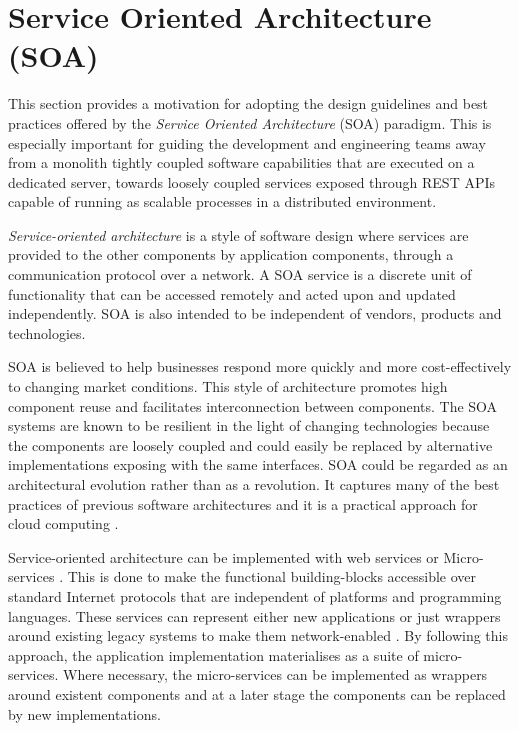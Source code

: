 	 \section{Service Oriented Architecture (SOA)}
	 \label{sec:soa}
	 
	 This section provides a motivation for adopting the design guidelines and best practices offered by the \textit{Service Oriented Architecture } (SOA) \cite{open2016soa} paradigm. This is especially important for guiding the development and engineering teams away from a monolith tightly coupled software capabilities that are executed on a dedicated server, towards loosely coupled services exposed through REST APIs capable of running as scalable processes in a distributed environment.
	  
	 \textit{Service-oriented architecture} is a style of software design where services are provided to the other components by application components, through a communication protocol over a network. A SOA service is a discrete unit of functionality that can be accessed remotely and acted upon and updated independently. SOA is also intended to be independent of vendors, products and technologies.
	 
	 SOA is believed to help businesses respond more quickly and more cost-effectively to changing market conditions. This style of architecture promotes high component reuse and facilitates interconnection between components. The SOA systems are known to be resilient in the light of changing technologies because the components are loosely coupled and could easily be replaced by alternative implementations exposing with the same interfaces.	SOA could be regarded as an architectural evolution rather than as a revolution. It captures many of the best practices of previous software architectures and it is a practical approach for cloud computing \citep{velte2019cloud}.
	 
	 Service-oriented architecture can be implemented with web services or Micro-services \citep{brandner2004web}. This is done to make the functional building-blocks accessible over standard Internet protocols that are independent of platforms and programming languages. These services can represent either new applications or just wrappers around existing legacy systems to make them network-enabled \citep{channabasavaiah2003migrating}. By following this approach, the application implementation materialises as a suite of micro-services. Where necessary, the micro-services can be implemented as wrappers around existent components and at a later stage the components can be replaced by new implementations. 